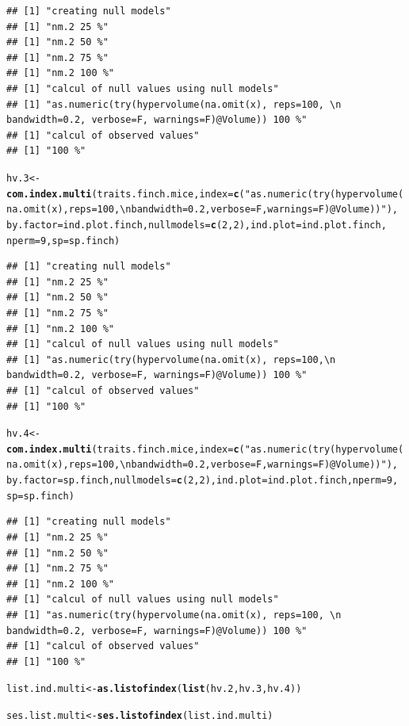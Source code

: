\documentclass[12pt]{article}\usepackage[]{graphicx}\usepackage[]{color}
\makeatletter
\newcommand{\hlnum}[1]{\textcolor[rgb]{0.686,0.059,0.569}{#1}}%
\newcommand{\hlstr}[1]{\textcolor[rgb]{0.192,0.494,0.8}{#1}}%
\newcommand{\hlstd}[1]{\textcolor[rgb]{0.345,0.345,0.345}{#1}}%
\newcommand{\hlkwb}[1]{\textcolor[rgb]{0.69,0.353,0.396}{#1}}%
\newcommand{\hlkwc}[1]{\textcolor[rgb]{0.333,0.667,0.333}{#1}}%
\newcommand{\hlkwd}[1]{\textcolor[rgb]{0.737,0.353,0.396}{\textbf{#1}}}%
\newenvironment{kframe}{%
 \def\at@end@of@kframe{}%
 \ifinner\ifhmode%
  \def\at@end@of@kframe{\end{minipage}}%
  \begin{minipage}{\columnwidth}%
 \fi\fi%
 \def\FrameCommand##1{\hskip\@totalleftmargin \hskip-\fboxsep
 \colorbox{shadecolor}{##1}\hskip-\fboxsep
     \hskip-\linewidth \hskip-\@totalleftmargin \hskip\columnwidth}%
 \MakeFramed {\advance\hsize-\width
   \@totalleftmargin\z@ \linewidth\hsize
   \@setminipage}}%
 {\par\unskip\endMakeFramed%
 \at@end@of@kframe}
\newenvironment{knitrout}{}{} %
\makeatother
\begin{document}
\begin{knitrout}
\begin{kframe}
\begin{alltt}
\end{alltt}
\begin{verbatim}
## [1] "creating null models"
## [1] "nm.2 25 %"
## [1] "nm.2 50 %"
## [1] "nm.2 75 %"
## [1] "nm.2 100 %"
## [1] "calcul of null values using null models"
## [1] "as.numeric(try(hypervolume(na.omit(x), reps=100, \n                                  bandwidth=0.2, verbose=F, warnings=F)@Volume)) 100 %"
## [1] "calcul of observed values"
## [1] "100 %"
\end{verbatim}
\begin{alltt}
\hlstd{hv.3} \hlkwb{<-} \hlkwd{com.index.multi}\hlstd{(traits.finch.mice,} \hlkwc{index} \hlstd{=} \hlkwd{c}\hlstd{(}\hlstr{"as.numeric(try(hypervolume(na.omit(x), reps=100,\textbackslash{}n                                  bandwidth=0.2, verbose=F, warnings=F)@Volume))"}\hlstd{),}
    \hlkwc{by.factor} \hlstd{= ind.plot.finch,} \hlkwc{nullmodels} \hlstd{=} \hlkwd{c}\hlstd{(}\hlnum{2}\hlstd{,} \hlnum{2}\hlstd{),} \hlkwc{ind.plot} \hlstd{= ind.plot.finch,}
    \hlkwc{nperm} \hlstd{=} \hlnum{9}\hlstd{,} \hlkwc{sp} \hlstd{= sp.finch)}
\end{alltt}
\begin{verbatim}
## [1] "creating null models"
## [1] "nm.2 25 %"
## [1] "nm.2 50 %"
## [1] "nm.2 75 %"
## [1] "nm.2 100 %"
## [1] "calcul of null values using null models"
## [1] "as.numeric(try(hypervolume(na.omit(x), reps=100,\n                                  bandwidth=0.2, verbose=F, warnings=F)@Volume)) 100 %"
## [1] "calcul of observed values"
## [1] "100 %"
\end{verbatim}
\begin{alltt}
\hlstd{hv.4} \hlkwb{<-} \hlkwd{com.index.multi}\hlstd{(traits.finch.mice,} \hlkwc{index} \hlstd{=} \hlkwd{c}\hlstd{(}\hlstr{"as.numeric(try(hypervolume(na.omit(x), reps=100, \textbackslash{}n                                  bandwidth=0.2, verbose=F, warnings=F)@Volume))"}\hlstd{),}
    \hlkwc{by.factor} \hlstd{= sp.finch,} \hlkwc{nullmodels} \hlstd{=} \hlkwd{c}\hlstd{(}\hlnum{2}\hlstd{,} \hlnum{2}\hlstd{),} \hlkwc{ind.plot} \hlstd{= ind.plot.finch,} \hlkwc{nperm} \hlstd{=} \hlnum{9}\hlstd{,}
    \hlkwc{sp} \hlstd{= sp.finch)}
\end{alltt}
\begin{verbatim}
## [1] "creating null models"
## [1] "nm.2 25 %"
## [1] "nm.2 50 %"
## [1] "nm.2 75 %"
## [1] "nm.2 100 %"
## [1] "calcul of null values using null models"
## [1] "as.numeric(try(hypervolume(na.omit(x), reps=100, \n                                  bandwidth=0.2, verbose=F, warnings=F)@Volume)) 100 %"
## [1] "calcul of observed values"
## [1] "100 %"
\end{verbatim}
\begin{alltt}
\hlstd{list.ind.multi} \hlkwb{<-} \hlkwd{as.listofindex}\hlstd{(}\hlkwd{list}\hlstd{(hv.2, hv.3, hv.4))}

\hlstd{ses.list.multi} \hlkwb{<-} \hlkwd{ses.listofindex}\hlstd{(list.ind.multi)}
\end{alltt}
\end{kframe}
\end{knitrout}
\end{document}
